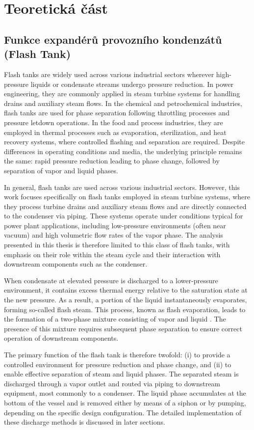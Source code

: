 \chapter{Teoretická část}

\section{Funkce expandérů provozního kondenzátů (Flash Tank)}
Flash tanks are widely used across various industrial sectors wherever high-pressure liquids or condensate streams undergo pressure reduction. In power engineering, they are commonly applied in steam turbine systems for handling drains and auxiliary steam flows. In the chemical and petrochemical industries, flash tanks are used for phase separation following throttling processes and pressure letdown operations. In the food and process industries, they are employed in thermal processes such as evaporation, sterilization, and heat recovery systems, where controlled flashing and separation are required. Despite differences in operating conditions and media, the underlying principle remains the same: rapid pressure reduction leading to phase change, followed by separation of vapor and liquid phases.

In general, flash tanks are used across various industrial sectors. However, this work focuses specifically on flash tanks employed in steam turbine systems, where they process turbine drains and auxiliary steam flows and are directly connected to the condenser via piping. These systems operate under conditions typical for power plant applications, including low-pressure environments (often near vacuum) and high volumetric flow rates of the vapor phase. The analysis presented in this thesis is therefore limited to this class of flash tanks, with emphasis on their role within the steam cycle and their interaction with downstream components such as the condenser.

When condensate at elevated pressure is discharged to a lower-pressure environment, it contains excess thermal energy relative to the saturation state at the new pressure. As a result, a portion of the liquid instantaneously evaporates, forming so-called flash steam. This process, known as flash evaporation, leads to the formation of a two-phase mixture consisting of vapor and liquid \cite{wang_construction_2023}. The presence of this mixture requires subsequent phase separation to ensure correct operation of downstream components.

The primary function of the flash tank is therefore twofold: (i) to provide a controlled environment for pressure reduction and phase change, and (ii) to enable effective separation of steam and liquid phases. The separated steam is discharged through a vapor outlet and routed via piping to downstream equipment, most commonly to a condenser. The liquid phase accumulates at the bottom of the vessel and is removed either by means of a siphon or by pumping, depending on the specific design configuration. The detailed implementation of these discharge methods is discussed in later sections.

